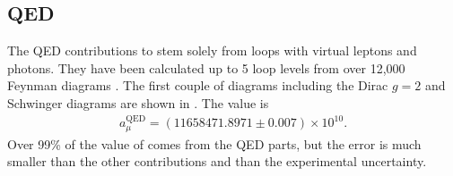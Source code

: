 \subsection{QED}
\label{subsec:QED}

The QED contributions to \amu stem solely from loops with virtual leptons and photons. They have been calculated up to 5 loop levels from over 12,000 Feynman diagrams \cite{Kinoshita1,Kinoshita2}. The first couple of diagrams including the Dirac $g = 2$ and Schwinger diagrams are shown in . The value is
		\begin{align}
            a_{\mu}^{\text{QED}} = (11658471.8971 \pm 0.007) \times 10^{10}.
		\end{align}
Over 99\% of the value of \amu comes from the QED parts, but the error is much smaller than the other contributions and than the experimental uncertainty.

